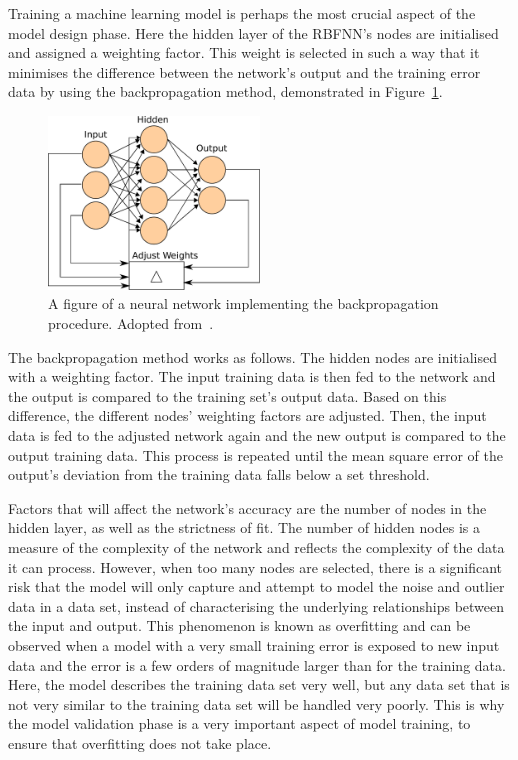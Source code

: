 Training a machine learning model is perhaps the most crucial aspect of the model design phase. Here the hidden layer of the RBFNN's nodes are initialised and assigned a weighting factor. This weight is selected in such a way that it minimises the difference between the network's output and the training error data by using the backpropagation method, demonstrated in Figure~\ref{fig:chap4-backprogagation}.

\begin{figure}
  \centering
  \includegraphics[width=0.5\textwidth]{figures/chapter4/backpropagation}
  \caption[A neural network implementing the backpropagation procedure.]{A figure of a neural network implementing the backpropagation procedure. Adopted from~\cite{ann-wiki-pic}.}
\label{fig:chap4-backprogagation}
\end{figure}

The backpropagation method works as follows. The hidden nodes are initialised with a weighting factor. The input training data is then fed to the network and the output is compared to the training set's output data. Based on this difference, the different nodes' weighting factors are adjusted. Then, the input data is fed to the adjusted network again and the new output is compared to the output training data. This process is repeated until the mean square error of the output's deviation from the training data falls below a set threshold. 

Factors that will affect the network's accuracy are the number of nodes in the hidden layer, as well as the strictness of fit. The number of hidden nodes is a measure of the complexity of the network and reflects the complexity of the data it can process. However, when too many nodes are selected, there is a significant risk that the model will only capture and attempt to model the noise and outlier data in a data set, instead of characterising the underlying relationships between the input and output. This phenomenon is known as overfitting and can be observed when a model with a very small training error is exposed to new input data and the error is a few orders of magnitude larger than for the training data. Here, the model describes the training data set very well, but any data set that is not very similar to the training data set will be handled very poorly. This is why the model validation phase is a very important aspect of model training, to ensure that overfitting does not take place. 

